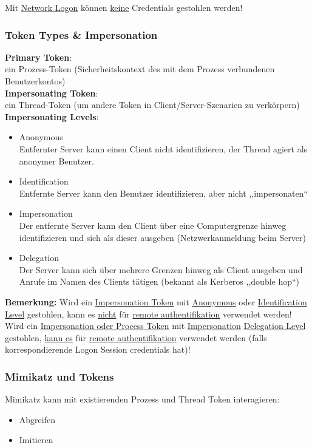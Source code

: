 Mit \underline{Network Logon} können \underline{keine} Credentials gestohlen werden!

\subsubsection{Token Types \& Impersonation}

\textbf{Primary Token}:\\
ein Prozess-Token (Sicherheitskontext des mit dem Prozess verbundenen Benutzerkontos)\\

\textbf{Impersonating Token}:\\
ein Thread-Token (um andere Token in Client/Server-Szenarien zu verkörpern)\\

\textbf{Impersonating Levels}:
\begin{itemize}
    \item Anonymous\\
    Entfernter Server kann einen Client nicht identifizieren, der Thread agiert als anonymer Benutzer.
    \item Identification\\
    Entfernte Server kann den Benutzer identifizieren, aber nicht ,,impersonaten``
    \item Impersonation\\
    Der entfernte Server kann den Client über eine Computergrenze hinweg identifizieren und sich als dieser ausgeben (Netzwerkanmeldung beim Server)
    \item Delegation\\
    Der Server kann sich über mehrere Grenzen hinweg als Client ausgeben und Anrufe im Namen des Clients tätigen (bekannt als Kerberos ,,double hop``)
\end{itemize}

\textbf{Bemerkung:}
Wird ein \underline{Impersonation Token} mit \underline{Anonymous} oder \underline{Identification Level} gestohlen, kann es \underline{nicht} für \underline{remote authentifikation} verwendet werden! \\
Wird ein \underline{Impersonation oder Process Token} mit \underline{Impersonation} \underline{Delegation Level} gestohlen, \underline{kann es} für \underline{remote authentifikation} verwendet werden (falls korrespondierende Logon Session credentials hat)!

\newpage

\subsubsection{Mimikatz und Tokens}
Mimikatz kann mit existierenden Prozess und Thread Token interagieren:
\begin{itemize}
    \item Abgreifen
    \item Imitieren
\end{itemize}

